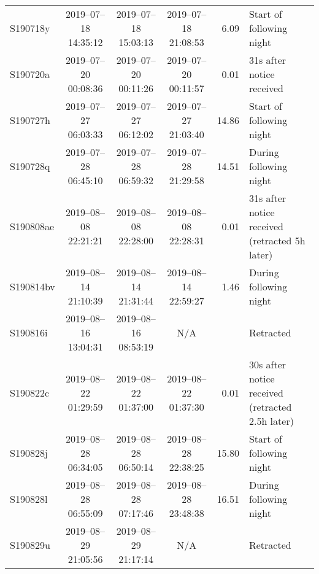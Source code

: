 \begin{colsection}
\begin{colsection}
\begin{sidewaystable}[p]
\begin{footnotesize}
\begin{center}
\begin{tabular}{l|cccrl}
            \\
            S190718y  &
            2019--07--18 14:35:12 &
            2019--07--18 15:03:13 &
            2019--07--18 21:08:53 &
            6.09 &
            Start of following night
            \\
            S190720a  &
            2019--07--20 00:08:36 &
            2019--07--20 00:11:26 &
            2019--07--20 00:11:57 &
            0.01 &
            31s after notice received
            \\
            S190727h  &
            2019--07--27 06:03:33 &
            2019--07--27 06:12:02 &
            2019--07--27 21:03:40 &
            14.86 &
            Start of following night
            \\
            S190728q  &
            2019--07--28 06:45:10 &
            2019--07--28 06:59:32 &
            2019--07--28 21:29:58 &
            14.51 &
            During following night
            \\
            S190808ae  &
            2019--08--08 22:21:21 &
            2019--08--08 22:28:00 &
            2019--08--08 22:28:31 &
            0.01 &
            31s after notice received (retracted 5h later)
            \\
            S190814bv  &
            2019--08--14 21:10:39 &
            2019--08--14 21:31:44 &
            2019--08--14 22:59:27 &
            1.46 &
            During following night
            \\
            S190816i  &
            2019--08--16 13:04:31 &
            2019--08--16 08:53:19 &
            N/A &
             &
            Retracted
            \\
            S190822c  &
            2019--08--22 01:29:59 &
            2019--08--22 01:37:00 &
            2019--08--22 01:37:30 &
            0.01 &
            30s after notice received (retracted 2.5h later)
            \\
            S190828j  &
            2019--08--28 06:34:05 &
            2019--08--28 06:50:14 &
            2019--08--28 22:38:25 &
            15.80 &
            Start of following night
            \\
            S190828l  &
            2019--08--28 06:55:09 &
            2019--08--28 07:17:46 &
            2019--08--28 23:48:38 &
            16.51 &
            During following night
            \\
            S190829u  &
            2019--08--29 21:05:56 &
            2019--08--29 21:17:14 &
            N/A &
             &
            Retracted
            \\


\end{tabular}
\end{center}
\end{footnotesize}
\end{sidewaystable}
\end{colsection}
\end{colsection}
